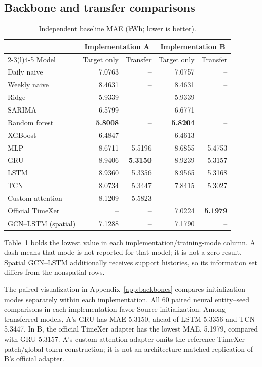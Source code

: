 \documentclass[pdflatex,iicol,sn-mathphys-num]{sn-jnl}
\begin{document}
\subsection{Backbone and transfer comparisons}
\begin{table}[t]
\centering\small
\caption{Independent baseline MAE (kWh; lower is better).}\label{tab:baselines}
\begin{tabular*}{\textwidth}{@{\extracolsep{\fill}}lrrrr@{}}\toprule
& \multicolumn{2}{c}{Implementation A} & \multicolumn{2}{c}{Implementation B}\\\cmidrule(lr){2-3}\cmidrule(l){4-5}
Model & Target only & Transfer & Target only & Transfer\\\midrule
Daily naive & 7.0763 & -- & 7.0757 & --\\
Weekly naive & 8.4631 & -- & 8.4631 & --\\
Ridge & 5.9339 & -- & 5.9339 & --\\
SARIMA & 6.5799 & -- & 6.6771 & --\\
Random forest & \textbf{5.8008} & -- & \textbf{5.8204} & --\\
XGBoost & 6.4847 & -- & 6.4613 & --\\
MLP & 8.6711 & 5.5196 & 8.6855 & 5.4753\\
GRU & 8.9406 & \textbf{5.3150} & 8.9239 & 5.3157\\
LSTM & 8.9360 & 5.3356 & 8.9565 & 5.3168\\
TCN & 8.0734 & 5.3447 & 7.8415 & 5.3027\\
Custom attention & 8.1209 & 5.5823 & -- & --\\
Official TimeXer & -- & -- & 7.0224 & \textbf{5.1979}\\
GCN--LSTM (spatial) & 7.1288 & -- & 7.1790 & --\\
\bottomrule\end{tabular*}
\end{table}

Table~\ref{tab:baselines} bolds the lowest value in each implementation/training-mode column. A dash means that mode is not reported for that model; it is not a zero result. Spatial GCN--LSTM additionally receives support histories, so its information set differs from the nonspatial rows.



The paired visualization in Appendix~\ref{app:backbones} compares initialization modes separately within each implementation. All 60 paired neural entity--seed comparisons in each implementation favor Source initialization. Among transferred models, A's GRU has MAE 5.3150, ahead of LSTM 5.3356 and TCN 5.3447. In B, the official TimeXer adapter \cite{wang2024timexer} has the lowest MAE, 5.1979, compared with GRU 5.3157. A's custom attention adapter omits the reference TimeXer patch/global-token construction; it is not an architecture-matched replication of B's official adapter.
\end{document}
